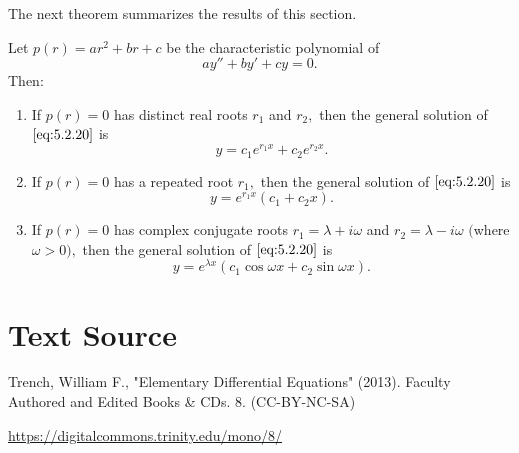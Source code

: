 \documentclass{ximera}
\begin{document}
The next theorem summarizes the results of this section.

\begin{theorem}\label{thmtype:5.2.1}
Let $p(r)=ar^2+br+c$ be the characteristic polynomial of
\begin{equation} \label{eq:5.2.20}
ay''+by'+cy=0.
\end{equation}
Then:
\begin{enumerate}
\item %
If $p(r)=0$  has distinct real roots $r_1$ and $r_2,$ then the general
solution of $\eqref{eq:5.2.20}$ is
$$
y=c_1e^{r_1x}+c_2e^{r_2x}.
$$
\item %
If $p(r)=0$  has a repeated root  $r_1,$ then
the general solution of $\eqref{eq:5.2.20}$ is
$$
y=e^{r_1x}(c_1+c_2x).
$$
\item %
If $p(r)=0$  has complex conjugate roots $r_1=\lambda+i\omega$ and
$r_2=\lambda-i\omega$ $($where $\omega>0),$ then the general solution
of $\eqref{eq:5.2.20}$ is
$$
y=e^{\lambda x}(c_1\cos\omega x+c_2\sin\omega x).
$$
\end{enumerate}
\end{theorem}

\section*{Text Source}
Trench, William F., "Elementary Differential Equations" (2013). Faculty Authored and Edited Books \& CDs. 8. (CC-BY-NC-SA)

\href{https://digitalcommons.trinity.edu/mono/8/}{https://digitalcommons.trinity.edu/mono/8/}
\end{document}
